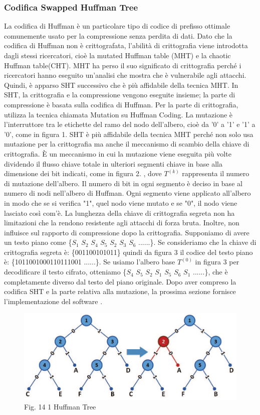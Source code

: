 \documentclass[a4paper]{report} %
\begin{document}
\subsubsection{Codifica Swapped Huffman Tree}
La codifica di Huffman è un particolare tipo di codice di prefisso ottimale comunemente usato per la compressione senza perdita di dati. Dato che la codifica di Huffman non è crittografata, l'abilità di crittografia viene introdotta dagli stessi ricercatori, cioè la mutated Huffman table (MHT) e la chaotic Huffman table(CHT). MHT ha perso il suo significato di crittografia perché i ricercatori hanno eseguito un'analisi che mostra che è vulnerabile agli attacchi. Quindi, è apparso SHT successivo che è più affidabile della tecnica MHT. In SHT, la crittografia e la compressione vengono eseguite insieme; la parte di compressione è basata sulla codifica di Huffman. Per la parte di crittografia, utilizza la tecnica chiamata Mutation su Huffman Coding. La mutazione è l'interruttore tra le etichette del ramo del nodo dell'albero, cioè da '0' a '1' e '1' a '0', come in figura 1. SHT è più affidabile della tecnica MHT perché non solo usa mutazione per la crittografia ma anche il meccanismo di scambio della chiave di crittografia. È un meccanismo in cui la mutazione viene eseguita più volte dividendo il flusso chiave totale in ulteriori segmenti chiave in base alla dimensione dei bit indicati, come in figura 2. , dove $T^{(k)}$ rappresenta il numero di mutazione dell'albero. Il numero di bit in ogni segmento è deciso in base al numero di nodi nell'albero di Huffman. Ogni segmento viene applicato all'albero in modo che se si verifica "1", quel nodo viene mutato e se "0", il nodo viene lasciato così com'è. La lunghezza della chiave di crittografia segreta non ha limitazioni che la rendono resistente agli attacchi di forza bruta. Inoltre, non influisce sul rapporto di compressione dopo la crittografia. Supponiamo di avere un testo piano come \{$S_1$ $S_2$ $S_4$ $S_5$ $S_2$ $S_3$ $S_6$ ......\}. Se consideriamo che la chiave di crittografia segreta è: \{001100101011\} quindi da figura 3 il codice del testo piano è: \{1011001000110111001 ......\}. Se usiamo l'albero base $T^{(0)}$ in figura 3 per decodificare il testo cifrato, otteniamo \{$S_4$ $S_5$ $S_2$ $S_1$ $S_5$ $S_6$ $S_1$ ......\}, che è completamente diverso dal testo del piano originale. Dopo aver compreso la codifica SHT e la parte relativa alla mutazione, la prossima sezione fornisce l'implementazione del software \cite{art:rif.45}.
\begin{figure}
\centering
\includegraphics[scale=.4]{Immagini/SHT1.png}
Fig. 14 1 Huffman Tree
\end{figure}
\end{document}
